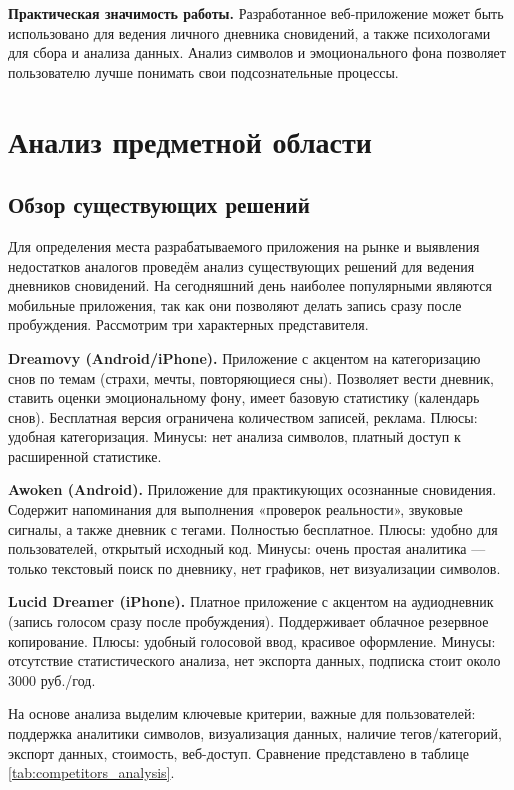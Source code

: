 \documentclass[14pt, a4paper]{extarticle}
\begin{document}
\textbf{Практическая значимость работы.} Разработанное веб-приложение может 
быть использовано для ведения личного дневника сновидений, а также психологами 
для сбора и анализа данных. Анализ символов и эмоционального фона позволяет 
пользователю лучше понимать свои подсознательные процессы.


\newpage


\section{Анализ предметной области}

\subsection{Обзор существующих решений}

Для определения места разрабатываемого приложения на рынке и выявления
недостатков аналогов проведём анализ существующих решений для ведения
дневников сновидений. На сегодняшний день наиболее популярными являются
мобильные приложения, так как они позволяют делать запись сразу после
пробуждения. Рассмотрим три характерных представителя.

\textbf{Dreamovy (Android/iPhone).} Приложение с акцентом на категоризацию
снов по темам (страхи, мечты, повторяющиеся сны). Позволяет вести
дневник, ставить оценки эмоциональному фону, имеет базовую статистику
(календарь снов). Бесплатная версия ограничена количеством записей,
реклама. Плюсы: удобная категоризация. Минусы: нет анализа символов,
платный доступ к расширенной статистике.

\textbf{Awoken (Android).} Приложение для практикующих осознанные
сновидения. Содержит напоминания для выполнения «проверок реальности»,
звуковые сигналы, а также дневник с тегами. Полностью бесплатное.
Плюсы: удобно для пользователей, открытый исходный код. Минусы: очень
простая аналитика — только текстовый поиск по дневнику, нет графиков,
нет визуализации символов.

\textbf{Lucid Dreamer (iPhone).} Платное приложение с акцентом на
аудиодневник (запись голосом сразу после пробуждения). Поддерживает
облачное резервное копирование. Плюсы: удобный голосовой ввод, красивое
оформление. Минусы: отсутствие статистического анализа, нет экспорта
данных, подписка стоит около 3000 руб./год.

На основе анализа выделим ключевые критерии, важные для пользователей:
поддержка аналитики символов, визуализация данных, наличие тегов/категорий,
экспорт данных, стоимость, веб-доступ. Сравнение представлено в таблице
\ref{tab:competitors_analysis}.
\end{document}
